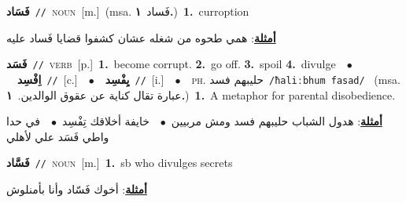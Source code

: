 \documentclass[10pt,a4paper,twoside]{article} %
\begin{document}
\begin{multicols}{2}
{\setlength\topsep{0pt}\textbf{\foreignlanguage{arabic}{فَسَاد}}\ {\color{gray}\texttt{//}\color{black}}\ \textsc{noun}\ [m.]\ \color{gray}(msa. \foreignlanguage{arabic}{فَساد}~\foreignlanguage{arabic}{\textbf{١.}})\color{black}\ \textbf{1.}~curroption\  \begin{flushright}\color{gray}\foreignlanguage{arabic}{\textbf{\underline{\foreignlanguage{arabic}{أمثلة}}}: همي طحوه من شغله عشان كشفوا قضايا فَساد عليه}\end{flushright}\color{black}} \vspace{2mm}

{\setlength\topsep{0pt}\textbf{\foreignlanguage{arabic}{فَسَد}}\ {\color{gray}\texttt{//}\color{black}}\ \textsc{verb}\ [p.]\ \textbf{1.}~become corrupt.  \textbf{2.}~go off.  \textbf{3.}~spoil  \textbf{4.}~divulge\ \ $\bullet$\ \ \setlength\topsep{0pt}\textbf{\foreignlanguage{arabic}{اِفْسِد}}\ {\color{gray}\texttt{//}\color{black}}\ [c.]\ \ $\bullet$\ \ \setlength\topsep{0pt}\textbf{\foreignlanguage{arabic}{يِفْسِد}}\ {\color{gray}\texttt{//}\color{black}}\ [i.]\ \ $\bullet$\ \ \textsc{ph.} \color{gray} \foreignlanguage{arabic}{حليبهم فسد}\color{black}\ {\color{gray}\texttt{/{\sffamily ħaliːbhum fasad}/}\color{black}}\ \color{gray} (msa. \foreignlanguage{arabic}{عبارة تقال كناية عن عقوق الوالدين.}~\foreignlanguage{arabic}{\textbf{١.}})\color{black}\ \textbf{1.}~A metaphor for parental disobedience.\  \begin{flushright}\color{gray}\foreignlanguage{arabic}{\textbf{\underline{\foreignlanguage{arabic}{أمثلة}}}: هدول الشباب حليبهم فسد ومش مربيين\ $\bullet$\ \  خايفة أخلاقك تِفْسِد\ $\bullet$\ \  في حدا واطي فَسَد علي لأهلي}\end{flushright}\color{black}} \vspace{2mm}

{\setlength\topsep{0pt}\textbf{\foreignlanguage{arabic}{فَسَّاد}}\ {\color{gray}\texttt{//}\color{black}}\ \textsc{noun}\ [m.]\ \textbf{1.}~sb who divulges secrets\  \begin{flushright}\color{gray}\foreignlanguage{arabic}{\textbf{\underline{\foreignlanguage{arabic}{أمثلة}}}: أخوك فَسّاد وأنا بأمنلوش}\end{flushright}\color{black}} \vspace{2mm}


\end{multicols}
\end{document}

